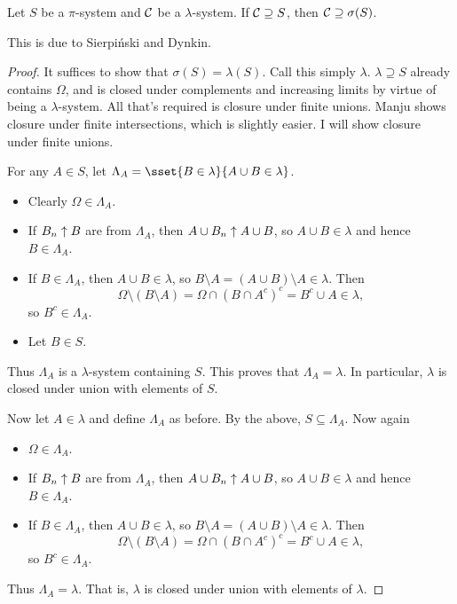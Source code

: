 \begin{theorem*}
\label{thm:pi-lambda}
    Let $S$ be a $\pi$-system and $\mathcal{C}$ be a $\lambda$-system.
    If $\mathcal{C} \supseteq S$, then $\mathcal{C} \supseteq \sigma(S)$.
\end{theorem*}
This is due to Sierpiński and Dynkin.
\begin{proof}
    It suffices to show that $\sigma(S) = \lambda(S)$.
    Call this simply $\lambda$.
    $\lambda \supseteq S$ already contains $\Omega$, and is closed under
    complements and increasing limits by virtue of being a $\lambda$-system.
    All that's required is closure under finite unions.
    Manju shows closure under finite intersections, which is slightly
    easier.
    I will show closure under finite unions.

    For any $A \in S$, let
    $\Lambda_A = \sset{B \in \lambda}{A \cup B \in \lambda}$.
    \begin{itemize}
        \item Clearly $\Omega \in \Lambda_A$.
        \item If $B_n \uparrow B$ are from $\Lambda_A$, then
        $A \cup B_n \uparrow A \cup B$,
        so $A \cup B \in \lambda$ and hence $B \in \Lambda_A$.
        \item If $B \in \Lambda_A$, then $A \cup B \in \lambda$,
        so $B \setminus A = (A \cup B) \setminus A \in \lambda$.
        Then \[
            \Omega \setminus (B \setminus A) = \Omega \cap (B \cap A^c)^c
            = B^c \cup A \in \lambda,
        \] so $B^c \in \Lambda_A$.
        \item Let $B \in S$. \TODO[HOW?]
    \end{itemize}
    Thus $\Lambda_A$ is a $\lambda$-system containing $S$.
    This proves that $\Lambda_A = \lambda$.
    In particular, $\lambda$ is closed under union with elements of $S$.

    Now let $A \in \lambda$ and define $\Lambda_A$ as before.
    By the above, $S \subseteq \Lambda_A$.
    Now again
    \begin{itemize}
        \item $\Omega \in \Lambda_A$.
        \item If $B_n \uparrow B$ are from $\Lambda_A$, then
        $A \cup B_n \uparrow A \cup B$,
        so $A \cup B \in \lambda$ and hence $B \in \Lambda_A$.
        \item If $B \in \Lambda_A$, then $A \cup B \in \lambda$,
        so $B \setminus A = (A \cup B) \setminus A \in \lambda$.
        Then \[
            \Omega \setminus (B \setminus A) = \Omega \cap (B \cap A^c)^c
            = B^c \cup A \in \lambda,
        \] so $B^c \in \Lambda_A$.
    \end{itemize}
    Thus $\Lambda_A = \lambda$.
    That is, $\lambda$ is closed under union with elements of $\lambda$.
\end{proof}

